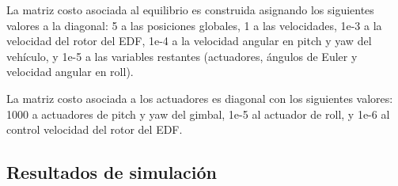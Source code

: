 La matriz costo asociada al equilibrio es construida asignando los siguientes valores a la diagonal: 5 a las posiciones globales, 1 a las velocidades, 1e-3 a la velocidad del rotor del EDF, 1e-4 a la velocidad angular en pitch y yaw del vehículo, y 1e-5 a las variables restantes (actuadores, ángulos de Euler y velocidad angular en roll).

La matriz costo asociada a los actuadores es diagonal con los siguientes valores: 1000 a actuadores de pitch y yaw del gimbal, 1e-5 al actuador de roll, y 1e-6 al control velocidad del rotor del EDF.


\subsection{Resultados de simulación}


